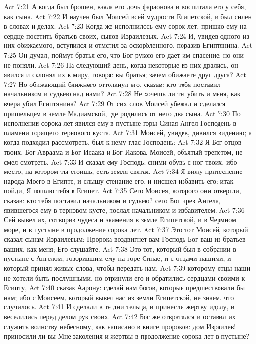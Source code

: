 Act 7:21  А когда был брошен, взяла его дочь фараонова и воспитала его у себя, как сына.
Act 7:22  И научен был Моисей всей мудрости Египетской, и был силен в словах и делах.
Act 7:23  Когда же исполнилось ему сорок лет, пришло ему на сердце посетить братьев своих, сынов Израилевых.
Act 7:24  И, увидев одного из них обижаемого, вступился и отмстил за оскорбленного, поразив Египтянина.
Act 7:25  Он думал, поймут братья его, что Бог рукою его дает им спасение; но они не поняли.
Act 7:26  На следующий день, когда некоторые из них дрались, он явился и склонял их к миру, говоря: вы братья; зачем обижаете друг друга?
Act 7:27  Но обижающий ближнего оттолкнул его, сказав: кто тебя поставил начальником и судьею над нами?
Act 7:28  Не хочешь ли ты убить и меня, как вчера убил Египтянина?
Act 7:29  От сих слов Моисей убежал и сделался пришельцем в земле Мадиамской, где родились от него два сына.
Act 7:30  По исполнении сорока лет явился ему в пустыне горы Синая Ангел Господень в пламени горящего тернового куста.
Act 7:31  Моисей, увидев, дивился видению; а когда подходил рассмотреть, был к нему глас Господень:
Act 7:32  Я Бог отцов твоих, Бог Авраама и Бог Исаака и Бог Иакова. Моисей, объятый трепетом, не смел смотреть.
Act 7:33  И сказал ему Господь: сними обувь с ног твоих, ибо место, на котором ты стоишь, есть земля святая.
Act 7:34  Я вижу притеснение народа Моего в Египте, и слышу стенание его, и нисшел избавить его: итак пойди, Я пошлю тебя в Египет.
Act 7:35  Сего Моисея, которого они отвергли, сказав: кто тебя поставил начальником и судьею? сего Бог чрез Ангела, явившегося ему в терновом кусте, послал начальником и избавителем.
Act 7:36  Сей вывел их, сотворив чудеса и знамения в земле Египетской, и в Чермном море, и в пустыне в продолжение сорока лет.
Act 7:37  Это тот Моисей, который сказал сынам Израилевым: Пророка воздвигнет вам Господь Бог ваш из братьев ваших, как меня; Его слушайте.
Act 7:38  Это тот, который был в собрании в пустыне с Ангелом, говорившим ему на горе Синае, и с отцами нашими, и который принял живые слова, чтобы передать нам,
Act 7:39  которому отцы наши не хотели быть послушными, но отринули его и обратились сердцами своими к Египту,
Act 7:40  сказав Аарону: сделай нам богов, которые предшествовали бы нам; ибо с Моисеем, который вывел нас из земли Египетской, не знаем, что случилось.
Act 7:41  И сделали в те дни тельца, и принесли жертву идолу, и веселились перед делом рук своих.
Act 7:42  Бог же отвратился и оставил их служить воинству небесному, как написано в книге пророков: дом Израилев! приносили ли вы Мне заколения и жертвы в продолжение сорока лет в пустыне?
